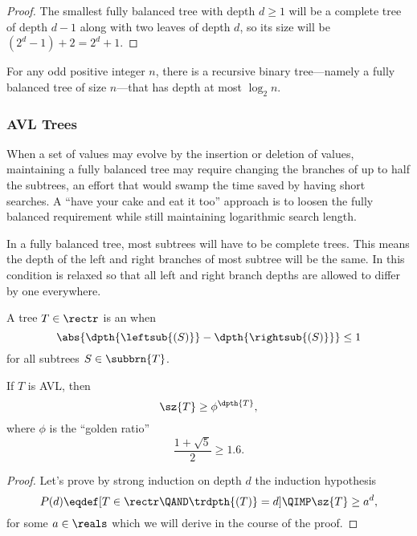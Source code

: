 \begin{definition}
\begin{theorem}
\begin{proof}
The smallest fully balanced tree with depth $d \geq 1$ will be a complete
tree of depth $d-1$ along with two leaves of depth $d$, so its size
will be $(2^d-1) + 2 = 2^d+1$.
\end{proof}
\end{theorem}

\begin{corollary}
For any odd positive integer $n$, there is a recursive binary
tree---namely a fully balanced tree of size $n$---that has depth at
most $\log_2 n$.
\end{corollary}

\subsubsection{AVL Trees}

When a set of values may evolve by the insertion or deletion of
values, maintaining a fully balanced tree may require changing the
branches of up to half the subtrees, an effort that would swamp the
time saved by having short searches.  A ``have your cake and eat it
too'' approach is to loosen the fully balanced requirement while still
maintaining logarithmic search length.  

In a fully balanced tree, most subtrees will have to be complete
trees.  This means the depth of the left and right branches of most
subtree will be the same.  In  this condition is
relaxed so that all left and right branch depths are allowed to differ
by one everywhere.

\begin{definition}
A tree $T\in \rectr$ is an  when
\[
\abs{\dpth{\leftsub{(S)}} - \dpth{\rightsub{(S)}}} \leq 1
\]
for all subtrees $S \in \subbrn{T}$.
\end{definition}


\begin{lemma}\label{avl_size}
If $T$ is AVL, then
\begin{equation}\label{sizeTphidT}
\sz{T} \geq \phi^{\dpth{T}}, 
\end{equation}
where $\phi$ is the ``golden ratio''
\[
\frac{1+\sqrt{5}}{2} \geq 1.6.
\]

\begin{proof}
Let's prove by strong induction on depth $d$ the induction hypothesis
\[
P(d) \eqdef [T \in \rectr \QAND \trdpth{(T)} = d] \QIMP \sz{T}
\geq a^d,
\]
for some $a \in \reals$ which we will derive in the course of the
proof.


\end{proof}
\end{lemma}
\end{definition}
